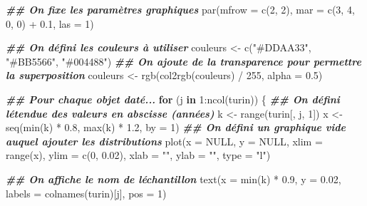\documentclass[
  french,
]{scrbook}
\newenvironment{Shaded}{\begin{snugshade}}{\end{snugshade}}
\newcommand{\AttributeTok}[1]{\textcolor[rgb]{0.77,0.63,0.00}{#1}}
\newcommand{\ConstantTok}[1]{\textcolor[rgb]{0.00,0.00,0.00}{#1}}
\newcommand{\ControlFlowTok}[1]{\textcolor[rgb]{0.13,0.29,0.53}{\textbf{#1}}}
\newcommand{\DecValTok}[1]{\textcolor[rgb]{0.00,0.00,0.81}{#1}}
\newcommand{\DocumentationTok}[1]{\textcolor[rgb]{0.56,0.35,0.01}{\textbf{\textit{#1}}}}
\newcommand{\FloatTok}[1]{\textcolor[rgb]{0.00,0.00,0.81}{#1}}
\newcommand{\FunctionTok}[1]{\textcolor[rgb]{0.00,0.00,0.00}{#1}}
\newcommand{\NormalTok}[1]{#1}
\newcommand{\OtherTok}[1]{\textcolor[rgb]{0.56,0.35,0.01}{#1}}
\newcommand{\SpecialCharTok}[1]{\textcolor[rgb]{0.00,0.00,0.00}{#1}}
\newcommand{\StringTok}[1]{\textcolor[rgb]{0.31,0.60,0.02}{#1}}
\begin{document}
\begin{Shaded}
\begin{Highlighting}[]
\DocumentationTok{\#\# On fixe les paramètres graphiques}
\FunctionTok{par}\NormalTok{(}\AttributeTok{mfrow =} \FunctionTok{c}\NormalTok{(}\DecValTok{2}\NormalTok{, }\DecValTok{2}\NormalTok{), }\AttributeTok{mar =} \FunctionTok{c}\NormalTok{(}\DecValTok{3}\NormalTok{, }\DecValTok{4}\NormalTok{, }\DecValTok{0}\NormalTok{, }\DecValTok{0}\NormalTok{) }\SpecialCharTok{+} \FloatTok{0.1}\NormalTok{, }\AttributeTok{las =} \DecValTok{1}\NormalTok{)}

\DocumentationTok{\#\# On défini les couleurs à utiliser}
\NormalTok{couleurs }\OtherTok{\textless{}{-}} \FunctionTok{c}\NormalTok{(}\StringTok{"\#DDAA33"}\NormalTok{, }\StringTok{"\#BB5566"}\NormalTok{, }\StringTok{"\#004488"}\NormalTok{)}
\DocumentationTok{\#\# On ajoute de la transparence pour permettre la superposition}
\NormalTok{couleurs }\OtherTok{\textless{}{-}} \FunctionTok{rgb}\NormalTok{(}\FunctionTok{col2rgb}\NormalTok{(couleurs) }\SpecialCharTok{/} \DecValTok{255}\NormalTok{, }\AttributeTok{alpha =} \FloatTok{0.5}\NormalTok{)}

\DocumentationTok{\#\# Pour chaque objet daté...}
\ControlFlowTok{for}\NormalTok{ (j }\ControlFlowTok{in} \DecValTok{1}\SpecialCharTok{:}\FunctionTok{ncol}\NormalTok{(turin)) \{}
  \DocumentationTok{\#\# On défini l\textquotesingle{}étendue des valeurs en abscisse (années)}
\NormalTok{  k }\OtherTok{\textless{}{-}} \FunctionTok{range}\NormalTok{(turin[, j, }\DecValTok{1}\NormalTok{])}
\NormalTok{  x }\OtherTok{\textless{}{-}} \FunctionTok{seq}\NormalTok{(}\FunctionTok{min}\NormalTok{(k) }\SpecialCharTok{*} \FloatTok{0.8}\NormalTok{, }\FunctionTok{max}\NormalTok{(k) }\SpecialCharTok{*} \FloatTok{1.2}\NormalTok{, }\AttributeTok{by =} \DecValTok{1}\NormalTok{)}
  \DocumentationTok{\#\# On défini un graphique vide auquel ajouter les distributions}
  \FunctionTok{plot}\NormalTok{(}\AttributeTok{x =} \ConstantTok{NULL}\NormalTok{, }\AttributeTok{y =} \ConstantTok{NULL}\NormalTok{, }\AttributeTok{xlim =} \FunctionTok{range}\NormalTok{(x), }\AttributeTok{ylim =} \FunctionTok{c}\NormalTok{(}\DecValTok{0}\NormalTok{, }\FloatTok{0.02}\NormalTok{),}
       \AttributeTok{xlab =} \StringTok{""}\NormalTok{, }\AttributeTok{ylab =} \StringTok{""}\NormalTok{, }\AttributeTok{type =} \StringTok{"l"}\NormalTok{)}

  \DocumentationTok{\#\# On affiche le nom de l\textquotesingle{}échantillon}
  \FunctionTok{text}\NormalTok{(}\AttributeTok{x =} \FunctionTok{min}\NormalTok{(k) }\SpecialCharTok{*} \FloatTok{0.9}\NormalTok{, }\AttributeTok{y =} \FloatTok{0.02}\NormalTok{, }\AttributeTok{labels =} \FunctionTok{colnames}\NormalTok{(turin)[j], }\AttributeTok{pos =} \DecValTok{1}\NormalTok{)}


\end{Highlighting}
\end{Shaded}
\end{document}

